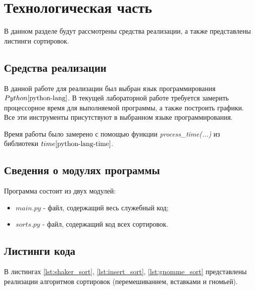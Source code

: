 \chapter{Технологическая часть}

В данном разделе будут рассмотрены средства реализации, а также представлены листинги сортировок.

\section{Средства реализации}
В данной работе для реализации был выбран язык программирования $Python \cite{python-lang}$. В текущей лабораторной работе требуется замерить процессорное время для выполняемой программы, а также построить графики. Все эти инструменты присутствуют в выбранном языке программирования.

Время работы было замерено с помощью функции \textit{process\_time(...)} из библиотеки $time \cite{python-lang-time}$.

\section{Сведения о модулях программы}
Программа состоит из двух модулей:
\begin{itemize}
	\item $main.py$ - файл, содержащий весь служебный код;
    \item $sorts.py$ - файл, содержащий код всех сортировок. \newline
\end{itemize}


\section{Листинги кода}

В листингах \ref{lst:shaker_sort}, \ref{lst:insert_sort}, \ref{lst:gnomme_sort} представлены реализации алгоритмов сортировок (перемешиванием, вставками и гномьей).

